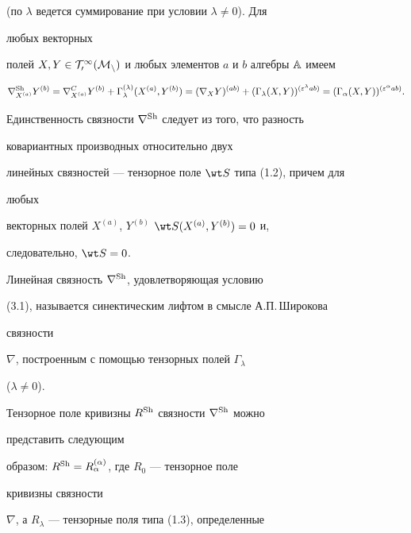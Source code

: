 (по $\lambda$ ведется суммирование при условии $\lambda\ne 0$). Для 


любых векторных  


полей $X,Y\in\cal T^1_0(M_n)$ и любых элементов $a$ и $b$ алгебры $\Bbb 


A$ имеем 


$$ 


\nabla^{\Sh}_{X^{(a)}}Y^{(b)}=\nabla^C_{X^{(a)}}Y^{(b)}+ 


\Gamma^{(\lambda)}_\lambda(X^{(a)},Y^{(b)})= 


(\nabla_X Y)^{(ab)}+(\Gamma_\lambda(X,Y) 


)^{(\varepsilon^\lambda ab)} 


=(\Gamma_\alpha(X,Y))^{(\varepsilon^\alpha ab)}. 


$$ 


Единственность связности $\nabla^{\operatorname{Sh}}$ следует из того, что разность 


ковариантных производных относительно двух 


линейных связностей --- тензорное поле $\wt S$ типа (1.2), причем для 


любых  


векторных полей $X^{(a)}$, $Y^{(b)}$\; $\wt S(X^{(a)},Y^{(b)})=0$ и,


следовательно, $\wt S=0$. 


 


\begin{defns} Линейная связность $\nabla^{\operatorname{Sh}}$, удовлетворяющая условию  


(3.1), называется синектическим лифтом в смысле А.П.\,Широкова 


связности 


$\nabla$, построенным с помощью тензорных полей $\Gamma_\lambda$ 


($\lambda\ne 0$). 


\end{defns} 


 


Тензорное поле кривизны $R^{\operatorname{Sh}}$ связности $\nabla^{\operatorname{Sh}}$ можно 


представить следующим 


образом: $R^{\operatorname{Sh}}=R^{(\alpha)}_\alpha$, где $R_0$ --- тензорное поле 


кривизны связности 


$\nabla$, а $R_\lambda$ --- тензорные поля типа (1.3), определенные 


